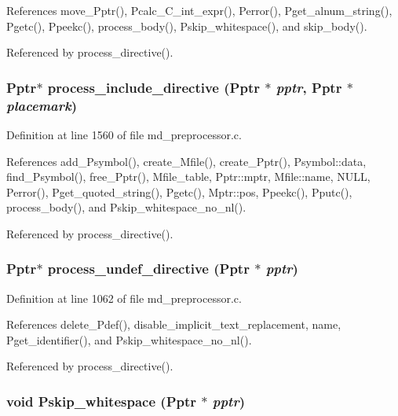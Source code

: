 References move\_\-Pptr(), Pcalc\_\-C\_\-int\_\-expr(), Perror(), Pget\_\-alnum\_\-string(), Pgetc(), Ppeekc(), process\_\-body(), Pskip\_\-whitespace(), and skip\_\-body().

Referenced by process\_\-directive().
\subsubsection{\setlength{\rightskip}{0pt plus 5cm}\bf{Pptr}$\ast$ process\_\-include\_\-directive (\bf{Pptr} $\ast$ {\em pptr}, \bf{Pptr} $\ast$ {\em placemark})}\label{md__preprocessor_8c_e93958001f8a6c56febf0557b9f3f7a3}




Definition at line 1560 of file md\_\-preprocessor.c.

References add\_\-Psymbol(), create\_\-Mfile(), create\_\-Pptr(), Psymbol::data, find\_\-Psymbol(), free\_\-Pptr(), Mfile\_\-table, Pptr::mptr, Mfile::name, NULL, Perror(), Pget\_\-quoted\_\-string(), Pgetc(), Mptr::pos, Ppeekc(), Pputc(), process\_\-body(), and Pskip\_\-whitespace\_\-no\_\-nl().

Referenced by process\_\-directive().
\subsubsection{\setlength{\rightskip}{0pt plus 5cm}\bf{Pptr}$\ast$ process\_\-undef\_\-directive (\bf{Pptr} $\ast$ {\em pptr})}\label{md__preprocessor_8c_c772ab2dc884637e79614531f700b0d3}




Definition at line 1062 of file md\_\-preprocessor.c.

References delete\_\-Pdef(), disable\_\-implicit\_\-text\_\-replacement, name, Pget\_\-identifier(), and Pskip\_\-whitespace\_\-no\_\-nl().

Referenced by process\_\-directive().
\subsubsection{\setlength{\rightskip}{0pt plus 5cm}void Pskip\_\-whitespace (\bf{Pptr} $\ast$ {\em pptr})}\label{md__preprocessor_8c_c1fa9396790747922ef69a79f8c21e8c}




